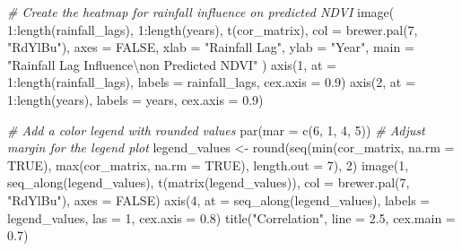\documentclass[
]{article}
\newenvironment{Shaded}{}{}
\newcommand{\AttributeTok}[1]{\textcolor[rgb]{0.49,0.56,0.16}{#1}}
\newcommand{\CommentTok}[1]{\textcolor[rgb]{0.38,0.63,0.69}{\textit{#1}}}
\newcommand{\ConstantTok}[1]{\textcolor[rgb]{0.53,0.00,0.00}{#1}}
\newcommand{\DecValTok}[1]{\textcolor[rgb]{0.25,0.63,0.44}{#1}}
\newcommand{\FloatTok}[1]{\textcolor[rgb]{0.25,0.63,0.44}{#1}}
\newcommand{\FunctionTok}[1]{\textcolor[rgb]{0.02,0.16,0.49}{#1}}
\newcommand{\NormalTok}[1]{#1}
\newcommand{\OtherTok}[1]{\textcolor[rgb]{0.00,0.44,0.13}{#1}}
\newcommand{\SpecialCharTok}[1]{\textcolor[rgb]{0.25,0.44,0.63}{#1}}
\newcommand{\StringTok}[1]{\textcolor[rgb]{0.25,0.44,0.63}{#1}}
\begin{document}
\begin{Shaded}
\begin{Highlighting}[]
\CommentTok{\# Create the heatmap for rainfall influence on predicted NDVI}
\FunctionTok{image}\NormalTok{(}
  \DecValTok{1}\SpecialCharTok{:}\FunctionTok{length}\NormalTok{(rainfall\_lags), }
  \DecValTok{1}\SpecialCharTok{:}\FunctionTok{length}\NormalTok{(years), }
  \FunctionTok{t}\NormalTok{(cor\_matrix), }
  \AttributeTok{col =} \FunctionTok{brewer.pal}\NormalTok{(}\DecValTok{7}\NormalTok{, }\StringTok{"RdYlBu"}\NormalTok{), }
  \AttributeTok{axes =} \ConstantTok{FALSE}\NormalTok{, }
  \AttributeTok{xlab =} \StringTok{"Rainfall Lag"}\NormalTok{, }
  \AttributeTok{ylab =} \StringTok{"Year"}\NormalTok{,}
  \AttributeTok{main =} \StringTok{"Rainfall Lag Influence}\SpecialCharTok{\textbackslash{}n}\StringTok{on Predicted NDVI"}
\NormalTok{)}
\FunctionTok{axis}\NormalTok{(}\DecValTok{1}\NormalTok{, }\AttributeTok{at =} \DecValTok{1}\SpecialCharTok{:}\FunctionTok{length}\NormalTok{(rainfall\_lags), }\AttributeTok{labels =}\NormalTok{ rainfall\_lags, }\AttributeTok{cex.axis =} \FloatTok{0.9}\NormalTok{)}
\FunctionTok{axis}\NormalTok{(}\DecValTok{2}\NormalTok{, }\AttributeTok{at =} \DecValTok{1}\SpecialCharTok{:}\FunctionTok{length}\NormalTok{(years), }\AttributeTok{labels =}\NormalTok{ years, }\AttributeTok{cex.axis =} \FloatTok{0.9}\NormalTok{)}

\CommentTok{\# Add a color legend with rounded values}
\FunctionTok{par}\NormalTok{(}\AttributeTok{mar =} \FunctionTok{c}\NormalTok{(}\DecValTok{6}\NormalTok{, }\DecValTok{1}\NormalTok{, }\DecValTok{4}\NormalTok{, }\DecValTok{5}\NormalTok{))  }\CommentTok{\# Adjust margin for the legend plot}
\NormalTok{legend\_values }\OtherTok{\textless{}{-}} \FunctionTok{round}\NormalTok{(}\FunctionTok{seq}\NormalTok{(}\FunctionTok{min}\NormalTok{(cor\_matrix, }\AttributeTok{na.rm =} \ConstantTok{TRUE}\NormalTok{), }
                           \FunctionTok{max}\NormalTok{(cor\_matrix, }\AttributeTok{na.rm =} \ConstantTok{TRUE}\NormalTok{), }
                           \AttributeTok{length.out =} \DecValTok{7}\NormalTok{), }\DecValTok{2}\NormalTok{)}
\FunctionTok{image}\NormalTok{(}\DecValTok{1}\NormalTok{, }\FunctionTok{seq\_along}\NormalTok{(legend\_values), }\FunctionTok{t}\NormalTok{(}\FunctionTok{matrix}\NormalTok{(legend\_values)), }
      \AttributeTok{col =} \FunctionTok{brewer.pal}\NormalTok{(}\DecValTok{7}\NormalTok{, }\StringTok{"RdYlBu"}\NormalTok{), }\AttributeTok{axes =} \ConstantTok{FALSE}\NormalTok{)}
\FunctionTok{axis}\NormalTok{(}\DecValTok{4}\NormalTok{, }\AttributeTok{at =} \FunctionTok{seq\_along}\NormalTok{(legend\_values), }
     \AttributeTok{labels =}\NormalTok{ legend\_values, }\AttributeTok{las =} \DecValTok{1}\NormalTok{, }\AttributeTok{cex.axis =} \FloatTok{0.8}\NormalTok{)}
\FunctionTok{title}\NormalTok{(}\StringTok{"Correlation"}\NormalTok{, }\AttributeTok{line =} \FloatTok{2.5}\NormalTok{, }\AttributeTok{cex.main =} \FloatTok{0.7}\NormalTok{)}
\end{Highlighting}
\end{Shaded}
\end{document}
